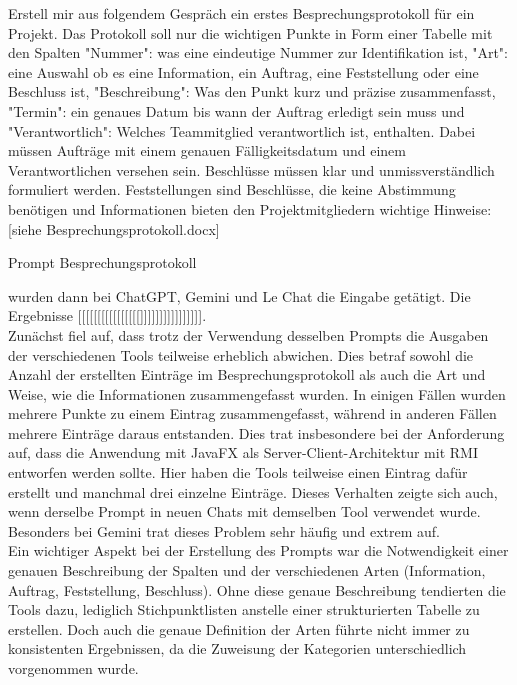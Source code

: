 \begin{prompt}[H]
    \begin{tcolorbox}[colback=gray!20, colframe=gray!20, boxrule=0pt, sharp corners] 
        Erstell mir aus folgendem Gespräch ein erstes Besprechungsprotokoll für ein Projekt. Das Protokoll soll nur 
        die wichtigen Punkte in Form einer Tabelle mit den Spalten "Nummer": was eine eindeutige Nummer zur 
        Identifikation ist, "Art": eine Auswahl ob es eine Information, ein Auftrag, eine Feststellung oder eine 
        Beschluss ist, "Beschreibung": Was den Punkt kurz und präzise zusammenfasst, "Termin": ein genaues Datum bis 
        wann der Auftrag erledigt sein muss und "Verantwortlich": Welches Teammitglied verantwortlich ist, enthalten. 
        Dabei müssen Aufträge mit einem genauen Fälligkeitsdatum und einem Verantwortlichen versehen sein. Beschlüsse 
        müssen klar und unmissverständlich formuliert werden. Feststellungen sind Beschlüsse, die keine Abstimmung 
        benötigen und Informationen bieten den Projektmitgliedern wichtige Hinweise: 
        [siehe Besprechungsprotokoll.docx]
        \vfill
    \end{tcolorbox}
    \caption{Prompt Besprechungsprotokoll}
    \label{Prompt Besprechungsprotokoll}
\end{prompt}

wurden dann bei ChatGPT, Gemini und Le Chat die Eingabe getätigt. Die Ergebnisse [[[[[[[[[[[[[[[[]]]]]]]]]]]]]]]].\\

Zunächst fiel auf, dass trotz der Verwendung desselben Prompts die Ausgaben der verschiedenen Tools teilweise erheblich abwichen. 
Dies betraf sowohl die Anzahl der erstellten Einträge im Besprechungsprotokoll als auch die Art und Weise, wie die Informationen 
zusammengefasst wurden. In einigen Fällen wurden mehrere Punkte zu einem Eintrag zusammengefasst, während in anderen Fällen mehrere 
Einträge daraus entstanden. Dies trat insbesondere bei der Anforderung auf, dass die Anwendung mit JavaFX als Server-Client-Architektur 
mit RMI entworfen werden sollte. Hier haben die Tools teilweise einen Eintrag dafür erstellt und manchmal drei einzelne Einträge. 
Dieses Verhalten zeigte sich auch, wenn derselbe Prompt in neuen Chats mit demselben Tool verwendet wurde. Besonders bei Gemini trat 
dieses Problem sehr häufig und extrem auf.\\

Ein wichtiger Aspekt bei der Erstellung des Prompts war die Notwendigkeit einer genauen Beschreibung der Spalten und der verschiedenen 
Arten (Information, Auftrag, Feststellung, Beschluss). Ohne diese genaue Beschreibung tendierten die Tools dazu, lediglich 
Stichpunktlisten anstelle einer strukturierten Tabelle zu erstellen. Doch auch die genaue Definition der Arten führte nicht immer zu 
konsistenten Ergebnissen, da die Zuweisung der Kategorien unterschiedlich vorgenommen wurde.\\

